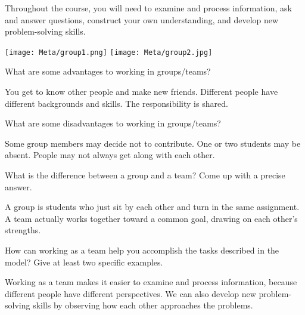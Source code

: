 

Throughout the course, you will need to examine and process information, ask and answer questions, construct your own understanding, and develop new problem-solving skills.

\begin{center}
\texttt{[image: Meta/group1.png]}
\hspace{0.5in}
\texttt{[image: Meta/group2.jpg]}
\end{center}



\Q What are some advantages to working in groups/teams?

\begin{answer}[5em]
You get to know other people and make new friends.
Different people have different backgrounds and skills.
The responsibility is shared.
\end{answer}


\Q What are some disadvantages to working in groups/teams?

\begin{answer}[5em]
Some group members may decide not to contribute.
One or two students may be absent.
People may not always get along with each other.
\end{answer}


\Q What is the difference between a group and a team?
Come up with a precise answer.

\begin{answer}[5em]
A group is students who just sit by each other and turn in the same assignment.
A team actually works together toward a common goal, drawing on each other's strengths.
\end{answer}


\Q How can working as a team help you accomplish the tasks described in the model?
Give at least two specific examples.

\begin{answer}[5em]
Working as a team makes it easier to examine and process information, because different people have different perspectives.
We can also develop new problem-solving skills by observing how each other approaches the problems.
\end{answer}
